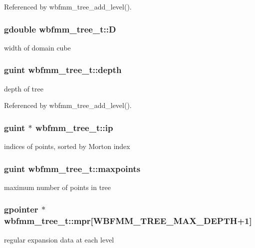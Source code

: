Referenced by wbfmm\+\_\+tree\+\_\+add\+\_\+level().

\subsubsection[{D}]{\setlength{\rightskip}{0pt plus 5cm}gdouble wbfmm\+\_\+tree\+\_\+t\+::\+D}\label{structwbfmm__tree__t_a3f8ee26d3fe9c69bb5ba7583711c2175}
width of domain cube 
\subsubsection[{depth}]{\setlength{\rightskip}{0pt plus 5cm}guint wbfmm\+\_\+tree\+\_\+t\+::depth}\label{structwbfmm__tree__t_ad6a069db29489d75083169ca0bca9901}
depth of tree 

Referenced by wbfmm\+\_\+tree\+\_\+add\+\_\+level().

\subsubsection[{ip}]{\setlength{\rightskip}{0pt plus 5cm}guint $\ast$ wbfmm\+\_\+tree\+\_\+t\+::ip}\label{structwbfmm__tree__t_ad1b0ef45823888a234d18840d655f8e0}
indices of points, sorted by Morton index 
\subsubsection[{maxpoints}]{\setlength{\rightskip}{0pt plus 5cm}guint wbfmm\+\_\+tree\+\_\+t\+::maxpoints}\label{structwbfmm__tree__t_a81074e586538485590e38b9bc9274326}
maximum number of points in tree 
\subsubsection[{mpr}]{\setlength{\rightskip}{0pt plus 5cm}gpointer $\ast$ wbfmm\+\_\+tree\+\_\+t\+::mpr[W\+B\+F\+M\+M\+\_\+\+T\+R\+E\+E\+\_\+\+M\+A\+X\+\_\+\+D\+E\+P\+T\+H+1]}\label{structwbfmm__tree__t_ac47b0aef61e58e198fa06d40e0eff738}
regular expansion data at each level 
